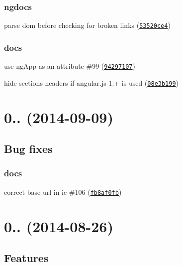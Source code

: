 \subsubsection*{ngdocs}


\begin{DoxyItemize}
\item parse dom before checking for broken links (\href{https://github.com/m7r/grunt-ngdocs/commit/53520ce4}{\tt 53520ce4})
\end{DoxyItemize}

\subsubsection*{docs}


\begin{DoxyItemize}
\item use ng\+App as an attribute \#99 (\href{https://github.com/m7r/grunt-ngdocs/commit/94297107}{\tt 94297107})
\item hide sections headers if angular.\+js 1.+ is used (\href{https://github.com/m7r/grunt-ngdocs/commit/08e3b199}{\tt 08e3b199})
\end{DoxyItemize}

\section*{0.. (2014-\/09-\/09)}

\subsection*{Bug fixes}

\subsubsection*{docs}


\begin{DoxyItemize}
\item correct base url in ie \#106 (\href{https://github.com/m7r/grunt-ngdocs/commit/fb8af0fb}{\tt fb8af0fb})
\end{DoxyItemize}

\section*{0.. (2014-\/08-\/26)}

\subsection*{Features}


